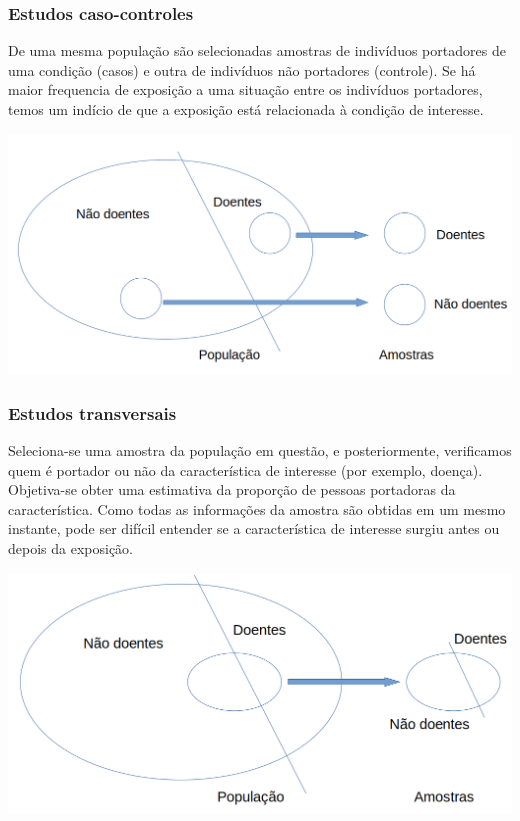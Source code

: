 \documentclass[11pt]{beamer}
\begin{document}
\begin{frame}
\frametitle{Estudos caso-controles}
De uma mesma população são selecionadas amostras de indivíduos portadores de uma condição (casos) e outra de indivíduos não portadores (controle). Se há maior frequencia de exposição a uma situação entre os indivíduos portadores, temos um indício de que a exposição está relacionada à condição de interesse.
\begin{center}\includegraphics[width=0.8\linewidth]{figs/caso_controle} \end{center}
\end{frame}

\begin{frame}
\frametitle{Estudos transversais}
Seleciona-se uma amostra da população em questão, e posteriormente, verificamos quem é portador ou não da característica de interesse (por exemplo, doença). Objetiva-se obter uma estimativa da proporção de pessoas portadoras da característica. Como todas as informações da amostra são obtidas em um mesmo instante, pode ser difícil entender se a característica de interesse surgiu antes ou depois da exposição.
\begin{center}\includegraphics[width=0.8\linewidth]{figs/estudos_transversais} \end{center}
\end{frame}
\end{document}

